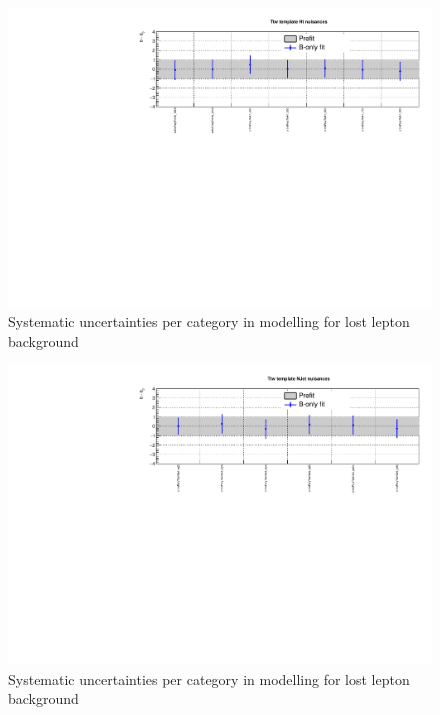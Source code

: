 \clearpage
\begin{figure}[h!]
  \centering
  \caption{Systematic uncertainties per \scalht category in \mht modelling for lost lepton background}
  \includegraphics[width=1.\linewidth]{figures/results/36invfb_freeze/postfit/nuis/TemplateTtw_ht_nuisances}
\end{figure}

\begin{figure}[h!]
  \centering
  \caption{Systematic uncertainties per \njet category in \mht modelling for lost lepton background}
  \includegraphics[width=1.\linewidth]{figures/results/36invfb_freeze/postfit/nuis/TemplateTtw_njet_nuisances}
\end{figure}

